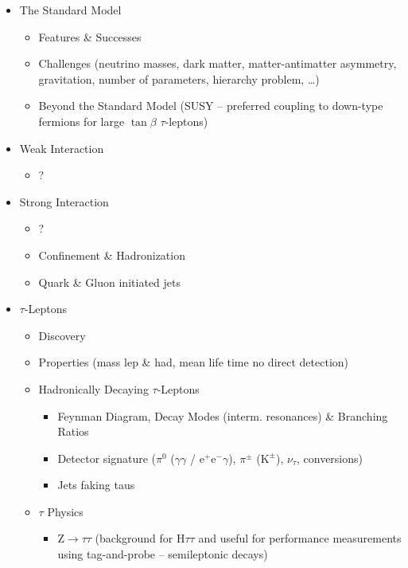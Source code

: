 \begin{itemize}
\item The Standard Model
  \begin{itemize}
  \item Features \& Successes

  \item Challenges (neutrino masses, dark matter, matter-antimatter asymmetry,
    gravitation, number of parameters, hierarchy problem, \ldots)

  \item Beyond the Standard Model (SUSY -- preferred coupling to down-type
    fermions for large $\tan\beta$ \textrightarrow $\tau$-leptons)
  \end{itemize}

\item Weak Interaction
\begin{itemize}
\item ?
\end{itemize}

\item Strong Interaction
\begin{itemize}
\item ?
\item Confinement \& Hadronization
\item Quark \& Gluon initiated jets
\end{itemize}

\item $\tau$-Leptons
\begin{itemize}
\item Discovery

\item Properties (mass \textrightarrow lep \& had, mean life time
  \textrightarrow no direct detection)

\item Hadronically Decaying $\tau$-Leptons
  \begin{itemize}
  \item Feynman Diagram, Decay Modes (interm. resonances) \& Branching Ratios
  \item Detector signature ($\pi^0$ ($\gamma \gamma$ / $\mathrm{e}^+
    \mathrm{e}^- \gamma$), $\pi^\pm$ ($\mathrm{K}^\pm$), $\nu_\tau$,
    conversions)
  \item Jets faking taus
  \end{itemize}

\item $\tau$ Physics
  \begin{itemize}
  \item $\mathrm{Z} \rightarrow \tau \tau$ (background for H$\tau \tau$ and
    useful for performance measurements using tag-and-probe -- semileptonic
    decays)


\end{itemize}
\end{itemize}
\end{itemize}
